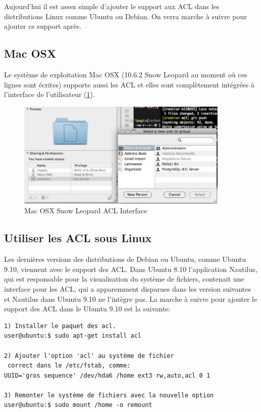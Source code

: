 Aujourd'hui il est assez simple d'ajouter le support aux ACL dans les distributions Linux comme Ubuntu ou Debian. On verra marche à suivre pour ajouter ce support après.

\subsection{Mac OSX}
Le système de exploitation Mac OSX (10.6.2 Snow Leopard au moment où ces lignes sont écrites) supporte aussi les ACL et elles sont complètement intégrées à l'interface de l'utilisateur (\ref{fig:img_mac-acl}). 

\begin{figure}[htbp]
	\centering
		\includegraphics[height=2in]{img/mac-acl.pdf}
	\caption{Mac OSX Snow Leopard ACL Interface}
	\label{fig:img_mac-acl}
\end{figure}

\subsection*{Utiliser les ACL sous Linux}


Les dernières versions des distributions de Debian ou Ubuntu, comme Ubuntu 9.10, viennent avec le support des ACL. Dans Ubuntu 8.10 l'application Nautilus, qui est responsable pour la visualisation du système de fichiers, contenait une interface pour les ACL, qui a apparemment disparues dans les version suivantes et Nautilus dans Ubuntu 9.10 ne l'intègre pas. La marche à suivre pour ajouter le support des ACL dans le Ubuntu 9.10 est la suivante:

\begin{verbatim}
1) Installer le paquet des acl. 
user@ubuntu:$ sudo apt-get install acl

2) Ajouter l'option 'acl' au système de fichier
 correct dans le /etc/fstab, comme:
UUID='gros sequence' /dev/hda6 /home ext3 rw,auto,acl 0 1

3) Remonter le système de fichiers avec la nouvelle option
user@ubuntu:$ sudo mount /home -o remount

\end{verbatim}

